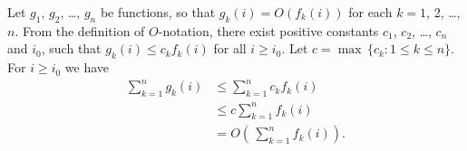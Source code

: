 Let $g_1$, $g_2$, \dots, $g_n$ be functions, so that $g_k(i)=O(f_k(i))$ for each $k=1$, 2, \dots, $n$.
From the definition of $O$-notation, there exist positive constants $c_1$, $c_2$, \dots, $c_n$ and $i_0$, such that $g_k(i)\le c_k f_k(i)$ for all $i\ge i_0$.
Let $c=\max\,\{c_k: 1\le k\le n\}$.
For $i\ge i_0$ we have
\begin{align*}
    \sum_{k=1}^n g_k(i) &\le \sum_{k=1}^n c_k f_k(i) \\
    &\le c\sum_{k=1}^n f_k(i) \\
    &= O\left(\,\sum_{k=1}^n f_k(i)\right).
\end{align*}
